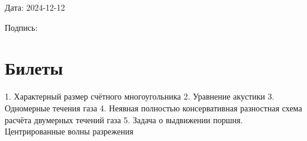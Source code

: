 \documentclass[a4paper,12pt]{article}
\begin{document}
Дата: 2024-12-12

Подпись: \underline{\hspace{3cm}}

\section*{Билеты}
1. Характерный размер счётного многоугольника
2. Уравнение акустики
3. Одномерные течения газа
4. Неявная полностью консервативная разностная схема расчёта двумерных течений газа
5. Задача о выдвижении поршня. Центрированные волны разрежения
\end{document}
